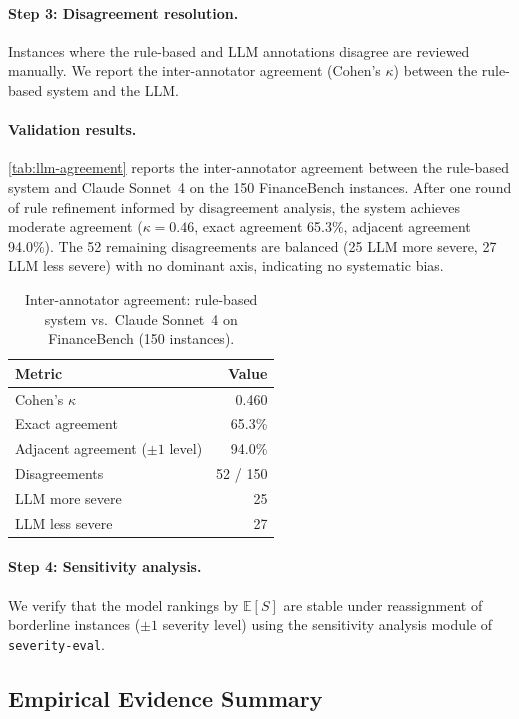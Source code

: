 \paragraph{Step 3: Disagreement resolution.}
Instances where the rule-based and LLM annotations disagree are
reviewed manually. We report the inter-annotator agreement (Cohen's
$\kappa$) between the rule-based system and the LLM.

\paragraph{Validation results.}
\autoref{tab:llm-agreement} reports the inter-annotator agreement
between the rule-based system and Claude Sonnet~4 on the 150
FinanceBench instances. After one round of rule refinement informed by
disagreement analysis, the system achieves moderate agreement
($\kappa = 0.46$, exact agreement 65.3\%, adjacent agreement 94.0\%).
The 52 remaining disagreements are balanced (25 LLM more severe, 27
LLM less severe) with no dominant axis, indicating no systematic bias.

\begin{table}[h]
\centering
\small
\begin{tabular}{lr}
\toprule
Metric & Value \\
\midrule
Cohen's $\kappa$ & 0.460 \\
Exact agreement & 65.3\% \\
Adjacent agreement ($\pm 1$ level) & 94.0\% \\
Disagreements & 52 / 150 \\
\quad LLM more severe & 25 \\
\quad LLM less severe & 27 \\
\bottomrule
\end{tabular}
\caption{Inter-annotator agreement: rule-based system vs.\ Claude
Sonnet~4 on FinanceBench (150 instances).}
\label{tab:llm-agreement}
\end{table}

\paragraph{Step 4: Sensitivity analysis.}
We verify that the model rankings by $\mathbb{E}[S]$ are stable under
reassignment of borderline instances ($\pm 1$ severity level) using the
sensitivity analysis module of \texttt{severity-eval}.

\subsection{Empirical Evidence Summary}
\label{sec:evidence-summary}


